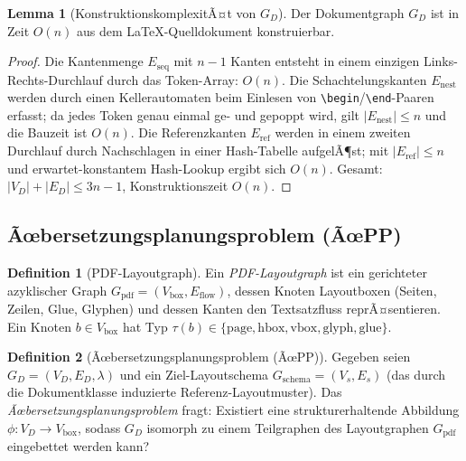 ﻿\documentclass[a4paper,12pt]{article}
\theoremstyle{definition}
\newtheorem{definition}{Definition}
\newtheorem{lemma}{Lemma}
\begin{document}
\begin{lemma}[KonstruktionskomplexitÃ¤t von $G_D$]
	\label{lem:ltx-graph-konstruktion}
	Der Dokumentgraph $G_D$ ist in Zeit $O(n)$ aus dem \LaTeX-Quelldokument
	konstruierbar.
\end{lemma}

\begin{proof}
	Die Kantenmenge $E_{\mathrm{seq}}$ mit $n-1$ Kanten entsteht in einem
	einzigen Links-Rechts-Durchlauf durch das Token-Array: $O(n)$.
	Die Schachtelungskanten $E_{\mathrm{nest}}$ werden durch einen Kellerautomaten
	beim Einlesen von \texttt{\textbackslash begin}/\texttt{\textbackslash end}-Paaren
	erfasst; da jedes Token genau einmal ge- und ge\-poppt wird, gilt
	$|E_{\mathrm{nest}}| \le n$ und die Bauzeit ist $O(n)$.
	Die Referenzkanten $E_{\mathrm{ref}}$ werden in einem zweiten Durchlauf
	durch Nachschlagen in einer Hash-Tabelle aufgelÃ¶st; mit
	$|E_{\mathrm{ref}}| \le n$ und erwartet-konstantem Hash-Lookup ergibt
	sich $O(n)$.
	Gesamt: $|V_D| + |E_D| \le 3n - 1$, Konstruktionszeit $O(n)$.
\end{proof}

\subsection{Ãœbersetzungsplanungsproblem (ÃœPP)}
\label{sec:ltx-upp}

\begin{definition}[PDF-Layoutgraph]
	\label{def:ltx-layout}
	Ein \emph{PDF-Layoutgraph} ist ein gerichteter azyklischer Graph
	$G_{\mathrm{pdf}} = (V_{\mathrm{box}}, E_{\mathrm{flow}})$, dessen Knoten
	Layoutboxen (Seiten, Zeilen, Glue, Glyphen) und dessen Kanten den
	Textsatzfluss reprÃ¤sentieren. Ein Knoten $b \in V_{\mathrm{box}}$ hat
	Typ $\tau(b) \in \{\mathrm{page}, \mathrm{hbox}, \mathrm{vbox},
	\mathrm{glyph}, \mathrm{glue}\}$.
\end{definition}

\begin{definition}[Ãœbersetzungsplanungsproblem (ÃœPP)]
	\label{def:ltx-upp}
	Gegeben seien $G_D = (V_D, E_D, \lambda)$ und ein Ziel-Layoutschema
	$G_{\mathrm{schema}} = (V_s, E_s)$ (das durch die Dokumentklasse induzierte
	Referenz-Layoutmuster). Das \emph{Ãœbersetzungsplanungsproblem} fragt:
	Existiert eine strukturerhaltende Abbildung
	$\phi: V_D \to V_{\mathrm{box}}$,
	sodass $G_D$ isomorph zu einem Teilgraphen des Layoutgraphen
	$G_{\mathrm{pdf}}$ eingebettet werden kann?
\end{definition}
\end{document}

